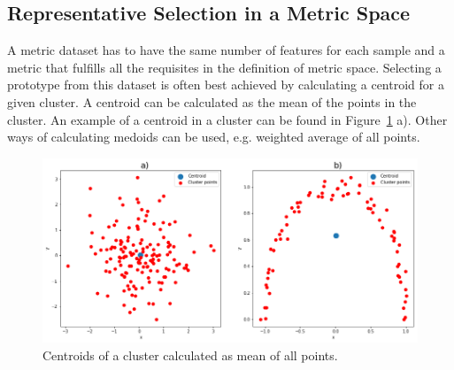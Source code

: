 \documentclass[thesis=B,english]{FITthesis}[2012/10/20]
\begin{document}
\subsection{Representative Selection in a Metric Space}\label{sec:rep_select_metric}
A metric dataset has to have the same number of features for each sample and a metric that fulfills all the requisites in the definition of metric space.
Selecting a prototype from this dataset is often best achieved by calculating a centroid for a given cluster.
A centroid can be calculated as the mean of the points in the cluster.
An example of a centroid in a cluster can be found in Figure~\ref{img:centroids} a).
Other ways of calculating medoids can be used, e.g. weighted average of all points.

\begin{figure}
  \includegraphics[width=\linewidth]{img/centroids.png}
  \caption{Centroids of a cluster calculated as mean of all points.}
  \label{img:centroids}
\end{figure}
\end{document}
